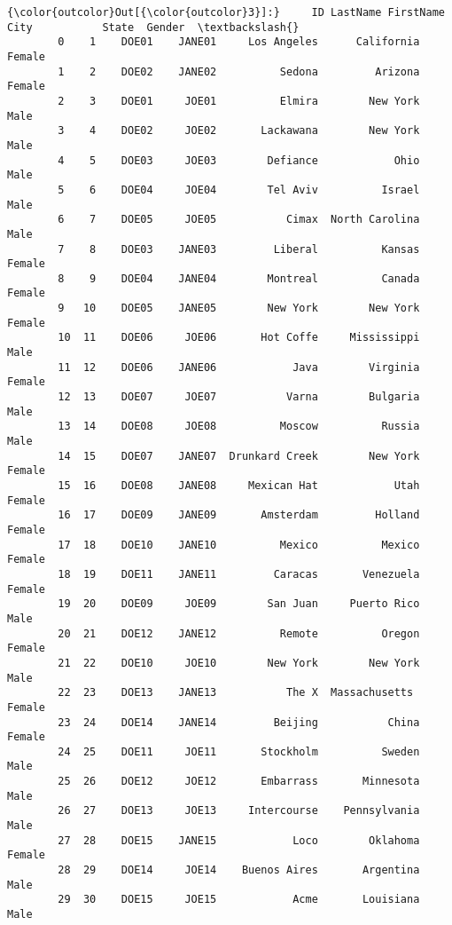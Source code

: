 \documentclass[11pt]{article}
\begin{document}
\begin{Verbatim}[commandchars=\\\{\}]
{\color{outcolor}Out[{\color{outcolor}3}]:}     ID LastName FirstName            City           State  Gender  \textbackslash{}
        0    1    DOE01    JANE01     Los Angeles      California  Female   
        1    2    DOE02    JANE02          Sedona         Arizona  Female   
        2    3    DOE01     JOE01          Elmira        New York    Male   
        3    4    DOE02     JOE02       Lackawana        New York    Male   
        4    5    DOE03     JOE03        Defiance            Ohio    Male   
        5    6    DOE04     JOE04        Tel Aviv          Israel    Male   
        6    7    DOE05     JOE05           Cimax  North Carolina    Male   
        7    8    DOE03    JANE03         Liberal          Kansas  Female   
        8    9    DOE04    JANE04        Montreal          Canada  Female   
        9   10    DOE05    JANE05        New York        New York  Female   
        10  11    DOE06     JOE06       Hot Coffe     Mississippi    Male   
        11  12    DOE06    JANE06            Java        Virginia  Female   
        12  13    DOE07     JOE07           Varna        Bulgaria    Male   
        13  14    DOE08     JOE08          Moscow          Russia    Male   
        14  15    DOE07    JANE07  Drunkard Creek        New York  Female   
        15  16    DOE08    JANE08     Mexican Hat            Utah  Female   
        16  17    DOE09    JANE09       Amsterdam         Holland  Female   
        17  18    DOE10    JANE10          Mexico          Mexico  Female   
        18  19    DOE11    JANE11         Caracas       Venezuela  Female   
        19  20    DOE09     JOE09        San Juan     Puerto Rico    Male   
        20  21    DOE12    JANE12          Remote          Oregon  Female   
        21  22    DOE10     JOE10        New York        New York    Male   
        22  23    DOE13    JANE13           The X  Massachusetts   Female   
        23  24    DOE14    JANE14         Beijing           China  Female   
        24  25    DOE11     JOE11       Stockholm          Sweden    Male   
        25  26    DOE12     JOE12       Embarrass       Minnesota    Male   
        26  27    DOE13     JOE13     Intercourse    Pennsylvania    Male   
        27  28    DOE15    JANE15            Loco        Oklahoma  Female   
        28  29    DOE14     JOE14    Buenos Aires       Argentina    Male   
        29  30    DOE15     JOE15            Acme       Louisiana    Male   
        

\end{Verbatim}
\end{document}
